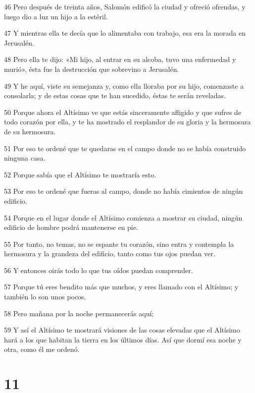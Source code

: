 \par 46 Pero después de treinta años, Salomón edificó la ciudad y ofreció ofrendas, y luego dio a luz un hijo a la estéril.
\par 47 Y mientras ella te decía que lo alimentaba con trabajo, esa era la morada en Jerusalén.
\par 48 Pero ella te dijo: «Mi hijo, al entrar en su alcoba, tuvo una enfermedad y murió», ésta fue la destrucción que sobrevino a Jerusalén.
\par 49 Y he aquí, viste su semejanza y, como ella lloraba por su hijo, comenzaste a consolarla; y de estas cosas que te han sucedido, éstas te serán reveladas.
\par 50 Porque ahora el Altísimo ve que estás sinceramente afligido y que sufres de todo corazón por ella, y te ha mostrado el resplandor de su gloria y la hermosura de su hermosura.
\par 51 Por eso te ordené que te quedaras en el campo donde no se había construido ninguna casa.
\par 52 Porque sabía que el Altísimo te mostraría esto.
\par 53 Por eso te ordené que fueras al campo, donde no había cimientos de ningún edificio.
\par 54 Porque en el lugar donde el Altísimo comienza a mostrar su ciudad, ningún edificio de hombre podrá mantenerse en pie.
\par 55 Por tanto, no temas, no se espante tu corazón, sino entra y contempla la hermosura y la grandeza del edificio, tanto como tus ojos puedan ver.
\par 56 Y entonces oirás todo lo que tus oídos puedan comprender.
\par 57 Porque tú eres bendito más que muchos, y eres llamado con el Altísimo; y también lo son unos pocos.
\par 58 Pero mañana por la noche permanecerás aquí;
\par 59 Y así el Altísimo te mostrará visiones de las cosas elevadas que el Altísimo hará a los que habitan la tierra en los últimos días. Así que dormí esa noche y otra, como él me ordenó.

\chapter{11}

